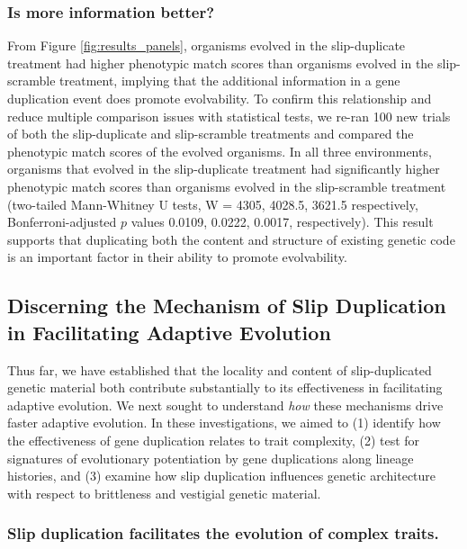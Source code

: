 \subsubsection{Is more information better?}
From Figure \ref{fig:results_panels}, organisms evolved in the slip-duplicate treatment had higher phenotypic match scores than organisms evolved in the slip-scramble treatment, implying that the additional information in a gene duplication event %
does
promote evolvability. To confirm this relationship and reduce multiple comparison issues with statistical tests, we re-ran 100 new trials of both the slip-duplicate and slip-scramble treatments %
and compared the phenotypic match scores of the evolved organisms. In all three environments, organisms that evolved in the slip-duplicate treatment had significantly higher phenotypic match scores than organisms evolved in the slip-scramble treatment (two-tailed Mann-Whitney U tests, W = 4305, 4028.5, 3621.5 respectively, Bonferroni-adjusted $p$ values 0.0109, 0.0222, 0.0017, respectively). This result supports that %
duplicating both the content and structure of existing genetic code is an important factor in their ability to promote evolvability.

\subsection{Discerning the Mechanism of Slip Duplication in Facilitating Adaptive Evolution}

Thus far, we have established that the locality and content of slip-duplicated genetic material both contribute substantially to its effectiveness in facilitating adaptive evolution.
We next sought to understand \textit{how} these mechanisms drive faster adaptive evolution.
In these investigations, we aimed to (1) identify how the effectiveness of gene duplication relates to trait complexity, (2) test for signatures of evolutionary potentiation by gene duplications along lineage histories, and (3) examine how slip duplication influences genetic architecture with respect to brittleness and vestigial genetic material.

\subsubsection{Slip duplication facilitates the evolution of complex traits.}

